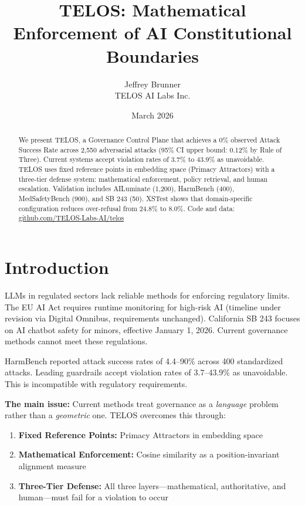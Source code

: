 \documentclass[11pt,twocolumn]{article}
\title{TELOS: Mathematical Enforcement of AI Constitutional Boundaries}
\author{Jeffrey Brunner\\TELOS AI Labs Inc.}
\date{March 2026}
\begin{document}
\maketitle

\begin{abstract}
We present TELOS, a Governance Control Plane that achieves a 0\% observed Attack Success Rate across 2,550 adversarial attacks (95\% CI upper bound: 0.12\% by Rule of Three). Current systems accept violation rates of 3.7\% to 43.9\% as unavoidable. TELOS uses fixed reference points in embedding space (Primacy Attractors) with a three-tier defense system: mathematical enforcement, policy retrieval, and human escalation. Validation includes AILuminate (1,200), HarmBench (400), MedSafetyBench (900), and SB 243 (50). XSTest shows that domain-specific configuration reduces over-refusal from 24.8\% to 8.0\%. Code and data: \url{github.com/TELOS-Labs-AI/telos}
\end{abstract}

\section{Introduction}

LLMs in regulated sectors lack reliable methods for enforcing regulatory limits. The EU AI Act requires runtime monitoring for high-risk AI (timeline under revision via Digital Omnibus, requirements unchanged). California SB 243 focuses on AI chatbot safety for minors, effective January 1, 2026. Current governance methods cannot meet these regulations.

HarmBench reported attack success rates of 4.4--90\% across 400 standardized attacks. Leading guardrails accept violation rates of 3.7--43.9\% as unavoidable. This is incompatible with regulatory requirements.

\textbf{The main issue:} Current methods treat governance as a \emph{language} problem rather than a \emph{geometric} one. TELOS overcomes this through:
\begin{enumerate}
    \item \textbf{Fixed Reference Points:} Primacy Attractors in embedding space
    \item \textbf{Mathematical Enforcement:} Cosine similarity as a position-invariant alignment measure
    \item \textbf{Three-Tier Defense:} All three layers---mathematical, authoritative, and human---must fail for a violation to occur
\end{enumerate}
\end{document}
